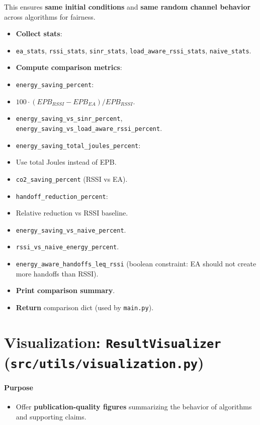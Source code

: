 \documentclass[conference]{IEEEtran}
\begin{document}
   This ensures \textbf{same initial conditions} and \textbf{same random channel behavior} across algorithms for fairness.
\begin{itemize}
\item \textbf{Collect stats}:
\item \texttt{ea\_stats}, \texttt{rssi\_stats}, \texttt{sinr\_stats}, \texttt{load\_aware\_rssi\_stats}, \texttt{naive\_stats}.
\item \textbf{Compute comparison metrics}:
\item \texttt{energy\_saving\_percent}:
\item \(100 \cdot (EPB_{RSSI} - EPB_{EA}) / EPB_{RSSI}\).
\item \texttt{energy\_saving\_vs\_sinr\_percent}, \texttt{energy\_saving\_vs\_load\_aware\_rssi\_percent}.
\item \texttt{energy\_saving\_total\_joules\_percent}:
\item Use total Joules instead of EPB.
\item \texttt{co2\_saving\_percent} (RSSI vs EA).
\item \texttt{handoff\_reduction\_percent}:
\item Relative reduction vs RSSI baseline.
\item \texttt{energy\_saving\_vs\_naive\_percent}.
\item \texttt{rssi\_vs\_naive\_energy\_percent}.
\item \texttt{energy\_aware\_handoffs\_leq\_rssi} (boolean constraint: EA should not create more handoffs than RSSI).
\item \textbf{Print comparison summary}.
\item \textbf{Return} comparison dict (used by \texttt{main.py}).
\end{itemize}



\section{Visualization: \texttt{ResultVisualizer} (\texttt{src/utils/visualization.py})}

\paragraph*{Purpose}
\begin{itemize}
\item Offer \textbf{publication-quality figures} summarizing the behavior of algorithms and supporting claims.
\end{itemize}
\end{document}
